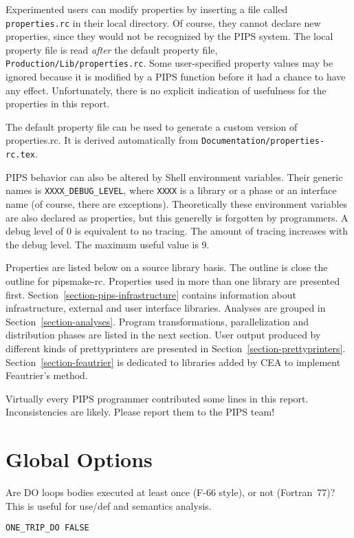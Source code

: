 Experimented users can modify properties by inserting a file called
\verb+properties.rc+ in their local directory. Of course, they cannot
declare new properties, since they would not be recognized by the PIPS
system. The local property file is read {\em after} the default property
file, \verb+Production/Lib/properties.rc+. Some user-specified property
values may be ignored because it is modified by a PIPS function before
it had a chance to have any effect. Unfortunately, there is no explicit
indication of usefulness for the properties in this report.

The default property file can be used to generate a custom version of
properties.rc. It is derived automatically from
\verb+Documentation/properties-rc.tex+.

PIPS behavior can also be altered by Shell environment variables. Their
generic names is \verb+XXXX_DEBUG_LEVEL+, where \verb+XXXX+ is a library
or a phase or an interface name (of course, there are
exceptions). Theoretically these environment variables are also declared
as properties, but this generelly is forgotten by programmers. A debug
level of 0 is equivalent to no tracing. The amount of tracing increases
with the debug level. The maximum useful value is 9.

Properties are listed below on a source library basis. The outline is
close the outline for pipsmake-rc\cite{}.  Properties used in more than
one library are presented
first. Section~\ref{section-pips-infrastructure} contains information
about infrastructure, external and user interface libraries. Analyses
are grouped in Section~\ref{section-analyses}. Program transformations,
parallelization and distribution phases are listed in the next
section. User output produced by different kinds of prettyprinters are
presented in
Section~\ref{section-prettyprinters}. Section~\ref{section-feautrier} is
dedicated to libraries added by CEA to implement Feautrier's method.

Virtually every PIPS programmer contributed some lines in this
report. Inconsistencies are likely. Please report them to the PIPS team!

\section{Global Options}

Are DO loops bodies executed at least once (F-66 style), or not (Fortran~77)?
This is useful for use/def and semantics analysis.

\begin{verbatim}
ONE_TRIP_DO FALSE
\end{verbatim}

